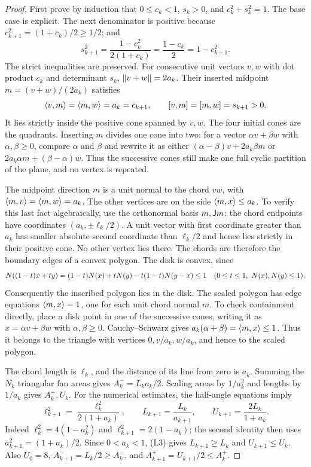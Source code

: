 \begin{proof}
First prove by induction that
$0\le c_k<1$, $s_k>0$, and $c_k^2+s_k^2=1$.
The base case is explicit. The next denominator is positive because
$c_{k+1}^2=(1+c_k)/2\ge1/2$; and
\[
 s_{k+1}^2=\frac{1-c_k^2}{2(1+c_k)}
           =\frac{1-c_k}{2}=1-c_{k+1}^2.
\]
The strict inequalities are preserved. For consecutive unit vectors
$v,w$ with dot product $c_k$ and determinant $s_k$,
$\lVert v+w\rVert=2a_k$. Their inserted midpoint $m=(v+w)/(2a_k)$ satisfies
\[
 \langle v,m\rangle=\langle m,w\rangle=a_k=c_{k+1},\qquad
 [v,m]=[m,w]=s_{k+1}>0.
\]
It lies strictly inside the positive cone spanned by $v,w$.
The four initial cones are the quadrants. Inserting $m$ divides one
cone into two: for a vector $\alpha v+\beta w$ with
$\alpha,\beta\ge0$, compare $\alpha$ and $\beta$ and rewrite it as
either $(\alpha-\beta)v+2a_k\beta m$ or
$2a_k\alpha m+(\beta-\alpha)w$.
Thus the successive cones still make one full cyclic partition of the
plane, and no vertex is repeated.

The midpoint direction $m$ is a unit normal to the chord $vw$, with
$\langle m,v\rangle=\langle m,w\rangle=a_k$. The other vertices are on the side
$\langle m,x\rangle\le a_k$. To verify this last fact algebraically, use the
orthonormal basis $m,\mathsf J m$: the chord endpoints have coordinates
$(a_k,\pm\ell_k/2)$. A unit vector with first coordinate greater than
$a_k$ has smaller absolute second coordinate than $\ell_k/2$ and hence
lies strictly in their positive cone. No other vertex lies there.
The chords are therefore the boundary edges of a convex polygon.
The disk is convex, since
\[
 N((1-t)x+ty)
 =(1-t)N(x)+tN(y)-t(1-t)N(y-x)\le1
 \quad(0\le t\le1,\ N(x),N(y)\le1).
\]
Consequently the inscribed polygon lies in the disk. The scaled
polygon has edge equations $\langle m,x\rangle=1$, one for each unit chord
normal $m$. To check containment directly, place a disk point in one of
the successive cones, writing it as $x=\alpha v+\beta w$ with
$\alpha,\beta\ge0$. Cauchy--Schwarz gives
$a_k(\alpha+\beta)=\langle m,x\rangle\le1$.
Thus it belongs to the triangle with vertices $0,v/a_k,w/a_k$,
and hence to the scaled polygon.

The chord length is $\ell_k$, and the distance of its line from zero is
$a_k$. Summing the $N_k$ triangular fan areas gives $A_k^-=L_ka_k/2$.
Scaling areas by $1/a_k^2$ and lengths by $1/a_k$ gives $A_k^+,U_k$.
For the numerical estimates, the half-angle equations imply
\[
 \ell_{k+1}^2=\frac{\ell_k^2}{2(1+a_k)},\qquad
 L_{k+1}=\frac{L_k}{a_{k+1}},\qquad
 U_{k+1}=\frac{2L_k}{1+a_k}.                         \tag{L3}
\]
Indeed $\ell_k^2=4(1-a_k^2)$ and
$\ell_{k+1}^2=2(1-a_k)$; the second identity then uses
$a_{k+1}^2=(1+a_k)/2$. Since $0<a_k<1$, (L3) gives
$L_{k+1}\ge L_k$ and $U_{k+1}\le U_k$.
Also $U_0=8$, $A_{k+1}^-=L_k/2\ge A_k^-$, and
$A_{k+1}^+=U_{k+1}/2\le A_k^+$.


\end{proof}
